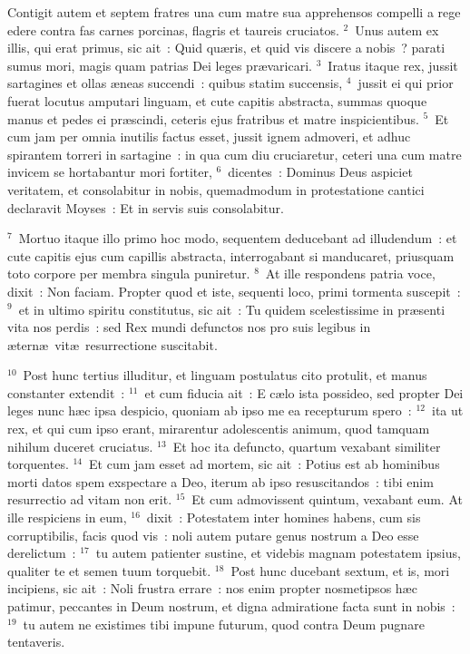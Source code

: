 \lettrine[lines=3,image=true,loversize=0.05,lraise=-0.03]{C}{}ontigit autem et septem fratres una cum matre sua apprehensos compelli a rege edere contra fas carnes porcinas, flagris et taureis cruciatos.
${}^{2}$~Unus autem ex illis, qui erat primus, sic ait~: Quid qu\ae ris, et quid vis discere a nobis~? parati sumus mori, magis quam patrias Dei leges pr\ae varicari.
${}^{3}$~Iratus itaque rex, jussit sartagines et ollas \ae neas succendi~: quibus statim succensis,
${}^{4}$~jussit ei qui prior fuerat locutus amputari linguam, et cute capitis abstracta, summas quoque manus et pedes ei pr\ae scindi, ceteris ejus fratribus et matre inspicientibus.
${}^{5}$~Et cum jam per omnia inutilis factus esset, jussit ignem admoveri, et adhuc spirantem torreri in sartagine~: in qua cum diu cruciaretur, ceteri una cum matre invicem se hortabantur mori fortiter,
${}^{6}$~dicentes~: Dominus Deus aspiciet veritatem, et consolabitur in nobis, quemadmodum in protestatione cantici declaravit Moyses~: Et in servis suis consolabitur.


${}^{7}$~Mortuo itaque illo primo hoc modo, sequentem deducebant ad illudendum~: et cute capitis ejus cum capillis abstracta, interrogabant si manducaret, priusquam toto corpore per membra singula puniretur.
${}^{8}$~At ille respondens patria voce, dixit~: Non faciam. Propter quod et iste, sequenti loco, primi tormenta suscepit~:
${}^{9}$~et in ultimo spiritu constitutus, sic ait~: Tu quidem scelestissime in pr\ae senti vita nos perdis~: sed Rex mundi defunctos nos pro suis legibus in \ae tern\ae\ vit\ae\ resurrectione suscitabit.


${}^{10}$~Post hunc tertius illuditur, et linguam postulatus cito protulit, et manus constanter extendit~:
${}^{11}$~et cum fiducia ait~: E c\ae lo ista possideo, sed propter Dei leges nunc h\ae c ipsa despicio, quoniam ab ipso me ea recepturum spero~:
${}^{12}$~ita ut rex, et qui cum ipso erant, mirarentur adolescentis animum, quod tamquam nihilum duceret cruciatus.
${}^{13}$~Et hoc ita defuncto, quartum vexabant similiter torquentes.
${}^{14}$~Et cum jam esset ad mortem, sic ait~: Potius est ab hominibus morti datos spem exspectare a Deo, iterum ab ipso resuscitandos~: tibi enim resurrectio ad vitam non erit.
${}^{15}$~Et cum admovissent quintum, vexabant eum. At ille respiciens in eum,
${}^{16}$~dixit~: Potestatem inter homines habens, cum sis corruptibilis, facis quod vis~: noli autem putare genus nostrum a Deo esse derelictum~:
${}^{17}$~tu autem patienter sustine, et videbis magnam potestatem ipsius, qualiter te et semen tuum torquebit.
${}^{18}$~Post hunc ducebant sextum, et is, mori incipiens, sic ait~: Noli frustra errare~: nos enim propter nosmetipsos h\ae c patimur, peccantes in Deum nostrum, et digna admiratione facta sunt in nobis~:
${}^{19}$~tu autem ne existimes tibi impune futurum, quod contra Deum pugnare tentaveris.


